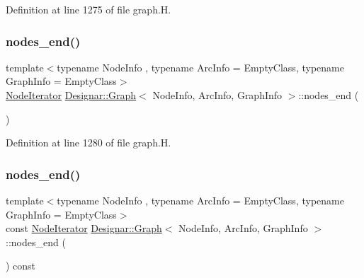 Definition at line 1275 of file graph.\+H.

\mbox{\label{class_designar_1_1_graph_a9f51b69f8827aabfe5b23f82e9bc5a4d}} 
\subsubsection{\texorpdfstring{nodes\+\_\+end()}{nodes\_end()}\hspace{0.1cm}{\footnotesize\ttfamily [1/2]}}
{\footnotesize\ttfamily template$<$typename Node\+Info , typename Arc\+Info  = Empty\+Class, typename Graph\+Info  = Empty\+Class$>$ \\
\hyperlink{class_designar_1_1_graph_1_1_node_iterator}{Node\+Iterator} \hyperlink{class_designar_1_1_graph}{Designar\+::\+Graph}$<$ Node\+Info, Arc\+Info, Graph\+Info $>$\+::nodes\+\_\+end (\begin{DoxyParamCaption}{ }\end{DoxyParamCaption})\hspace{0.3cm}{\ttfamily [inline]}}



Definition at line 1280 of file graph.\+H.

\mbox{\label{class_designar_1_1_graph_abb7e32a8a05850e788f4017677965b49}} 
\subsubsection{\texorpdfstring{nodes\+\_\+end()}{nodes\_end()}\hspace{0.1cm}{\footnotesize\ttfamily [2/2]}}
{\footnotesize\ttfamily template$<$typename Node\+Info , typename Arc\+Info  = Empty\+Class, typename Graph\+Info  = Empty\+Class$>$ \\
const \hyperlink{class_designar_1_1_graph_1_1_node_iterator}{Node\+Iterator} \hyperlink{class_designar_1_1_graph}{Designar\+::\+Graph}$<$ Node\+Info, Arc\+Info, Graph\+Info $>$\+::nodes\+\_\+end (\begin{DoxyParamCaption}{ }\end{DoxyParamCaption}) const\hspace{0.3cm}{\ttfamily [inline]}}



